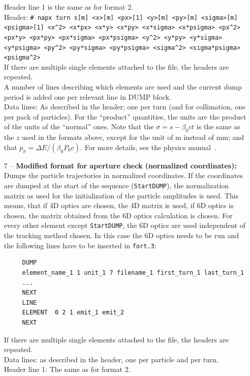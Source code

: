 \begin{enumerate}
        Header line 1 is the same as for format 2.\\
	Header: \texttt{\# napx turn s[m] <x>[m] <px>[1] <y>[m] <py>[m] <sigma>[m] <psigma>[1] <x\^{}2> <x*px> <x*y> <x*py> <x*sigma> <x*psigma> <px\^{}2> <px*y> <px*py> <px*sigma> <px*psigma> <y\^{}2> <y*py> <y*sigma> <y*psigma> <py\^{}2> <py*sigma> <py*psigma> <sigma\^{}2> <sigma*psigma> <psigma\^{}2>}\\
        If there are multiple single elements attached to the file, the headers are repeated.\\
	A number of lines describing which elements are used and the current dump period is added one per relevant line in DUMP block.\\
	Data lines: As described in the header; one per turn (and for collimation, one per pack of particles).
        For the ``product'' quantities, the units are the product of the units of the ``normal'' ones.
        Note that the $\sigma=s -\beta_0 c t$ is the same as the $z$ used in the formats above, except for the unit of m instead of mm; and that $p_\sigma = \Delta E / \left(\beta_0 P_0 c\right)$.
        For more details, see the physics manual~\cite{sixphys}.
     \item[7] -- \textbf{Modified format for aperture check (normalized coordinates):}\\
      Dumps the particle trajectories in normalized coordinates. If the coordinates are dumped at the start of the sequence (\texttt{StartDUMP}), the normalization matrix as used for the initialization of the particle amplitudes is used. This means, that if 4D optics are chosen, the 4D matrix is used, if 6D optics is chosen, the matrix obtained from the 6D optics calculation is chosen. For every other element except \texttt{StartDUMP}, the 6D optics are used independent of the tracking method chosen. In this case the 6D optics needs to be run and the following lines have to be inserted in \texttt{fort.3}:
     \begin{verbatim}
     DUMP
     element_name_1 1 unit_1 7 filename_1 first_turn_1 last_turn_1
     ...
     NEXT
     LINE
     ELEMENT  0 2 1 emit_1 emit_2
     NEXT
     \end{verbatim} 
     If there are multiple single elements attached to the file, the headers are repeated.\\
     Data lines: as described in the header, one per particle and per turn.\\
     Header line 1: The same as for format 2.\\

\end{enumerate}
